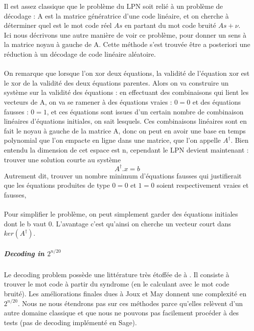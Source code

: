 \documentclass{article}		%
\theoremstyle{definition}
\theoremstyle{plain}
\theoremstyle{plain}
\theoremstyle{plain}
\theoremstyle{plain}
\theoremstyle{plain}
\begin{document}
Il est assez classique que le problème du LPN soit relié à un problème de
décodage : A est la matrice génératrice d'une code linéaire, et on
cherche à déterminer quel est le mot code réel $As$ en partant du mot code
bruité $As+\nu$.
\\
 Ici nous décrivons une autre manière de voir ce
problème, pour donner un sens à la matrice noyau à gauche de A. Cette
méthode s'est trouvée être a posteriori une réduction à un décodage de
code linéaire aléatoire.
\\\\
\label{SVP} 
On remarque que lorsque l'on xor deux équations, la validité de
l'équation xor est le xor de la validité des deux équations parentes.
Alors on va construire un système sur la validité des équations : en
effectuant des combinaisons qui lient les vecteurs de A, on va se ramener
à des équations vraies : $0=0$ et des équations fausses : $0=1$, et ces
équations sont issues d'un certain nombre de combinaison linéaires
d'équations initiales, on sait lesquels. Ces combinaisons linéaires sont en
fait le noyau à gauche de la matrice A, donc on peut en avoir une base en
temps polynomial que l'on empacte en ligne dans une matrice, que l'on
appelle $A^\dagger$. Bien entendu la dimension de cet espace est n,
cependant le LPN devient maintenant : trouver une solution courte au
système  $$A^\dagger.x=b$$ Autrement dit, trouver un nombre minimum
d'équations fausses qui justifierait que les équations produites de type $0=0$ et
$1=0$ soient respectivement vraies et fausses, \\\\
Pour simplifier le problème, on peut simplement garder des équations initiales dont le b vaut 0. 
L'avantage c'est qu'ainsi on cherche un
vecteur court dans $ker(A^\dagger)$. 


\subparagraph{Decoding in $2^{n/20}$} 
Le decoding problem possède une littérature très étoffée de \cite{Stern}
à \cite{Joux}. Il consiste à trouver le mot code à partir du syndrome (en
le calculant avec le mot code bruité). Les améliorations finales dues à
Joux et May donnent une complexité en $2^{n/20}$. Nous ne nous étendrons
pas sur ces méthodes parce qu'elles relèvent d'un autre domaine classique
et que nous ne pouvons pas facilement procéder à des tests (pas de
decoding implémenté en Sage).
\end{document}
